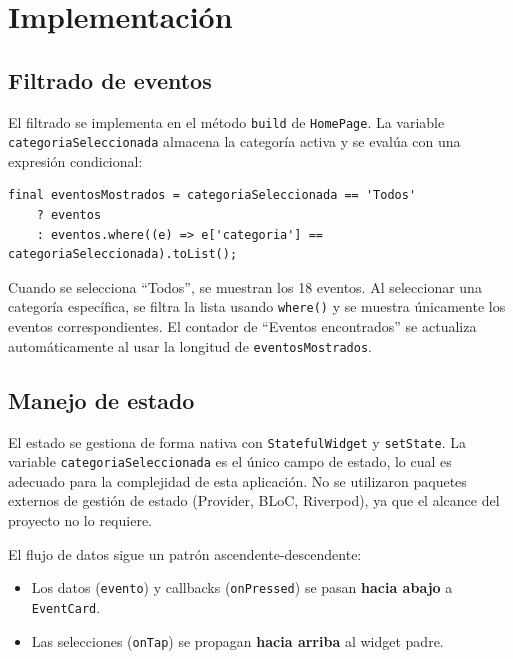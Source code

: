 \documentclass[12pt, a4paper]{article}
\begin{document}
\section{Implementación}

\subsection{Filtrado de eventos}

El filtrado se implementa en el método \texttt{build} de \texttt{HomePage}. La variable \texttt{categoriaSeleccionada} almacena la categoría activa y se evalúa con una expresión condicional:

\begin{lstlisting}[basicstyle=\ttfamily\small]
final eventosMostrados = categoriaSeleccionada == 'Todos'
    ? eventos
    : eventos.where((e) => e['categoria'] == categoriaSeleccionada).toList();
\end{lstlisting}

Cuando se selecciona ``Todos'', se muestran los 18 eventos. Al seleccionar una categoría específica, se filtra la lista usando \texttt{where()} y se muestra únicamente los eventos correspondientes. El contador de ``Eventos encontrados'' se actualiza automáticamente al usar la longitud de \texttt{eventosMostrados}.

\subsection{Manejo de estado}

El estado se gestiona de forma nativa con \texttt{StatefulWidget} y \texttt{setState}. La variable \texttt{categoriaSeleccionada} es el único campo de estado, lo cual es adecuado para la complejidad de esta aplicación. No se utilizaron paquetes externos de gestión de estado (Provider, BLoC, Riverpod), ya que el alcance del proyecto no lo requiere.

El flujo de datos sigue un patrón ascendente-descendente:
\begin{itemize}[noitemsep]
    \item Los datos (\texttt{evento}) y callbacks (\texttt{onPressed}) se pasan \textbf{hacia abajo} a \texttt{EventCard}.
    \item Las selecciones (\texttt{onTap}) se propagan \textbf{hacia arriba} al widget padre.
\end{itemize}
\end{document}
